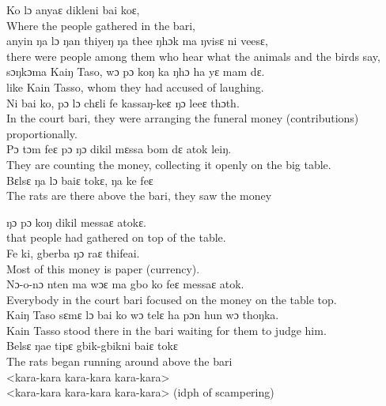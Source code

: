 Ko lɔ anyaɛ dikleni bai koɛ,\\ 
Where the people gathered in the bari,\\ 

anyin ŋa lɔ ŋan thiyeŋ ŋa thee ŋhɔk ma ŋvisɛ ni veesɛ,\\
there were people among them who hear what the animals and the birds say,\\

sɔŋkɔma Kaiŋ Taso, wɔ pɔ koŋ ka ŋhɔ ha yɛ mam dɛ.\\
like Kain Tasso, whom they had accused of laughing.\\

Ni bai ko, pɔ lɔ chɛli fe kassaŋ-keɛ ŋɔ leeɛ thɔth.\\
In the court bari, they were arranging the funeral money (contributions) proportionally.\\

Pɔ tɔm feɛ pɔ ŋɔ dikil mɛssa bom dɛ atok leiŋ.\\
They are counting the money, collecting it openly on the big table.\\

Bɛlsɛ ŋa lɔ baiɛ tokɛ, ŋa ke feɛ\\ 
The rats are there above the bari, they saw the money\newpage

ŋɔ pɔ koŋ dikil messaɛ atokɛ.\\
that people had gathered on top of the table.\\

Fe ki, gberba ŋɔ raɛ thifeai.\\
Most of this money is paper (currency).\\

Nɔ-o-nɔ nten ma wɔɛ ma gbo ko feɛ messaɛ atok.\\
Everybody in the court bari focused on the money on the table top.\\

Kaiŋ Taso sɛmɛ lɔ bai ko wɔ telɛ ha pɔn hun wɔ thoŋka.\\
Kain Tasso stood there in the bari waiting for them to judge him.\\

Belsɛ ŋae tipɛ gbik-gbikni baiɛ tokɛ\\ 
The rats began running around above the bari\\ 

<kara-kara kara-kara kara-kara>\\ 
<kara-kara kara-kara kara-kara> (idph of scampering)\\ 

